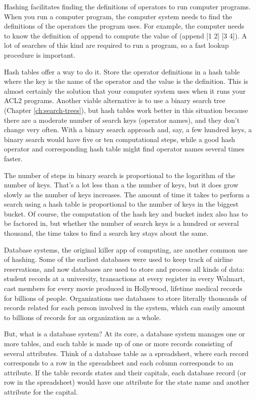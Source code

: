 Hashing facilitates finding the definitions of operators
to run computer programs.
When you run a computer program,
the computer system needs to find the definitions
of the operators the program uses.
For example, the computer needs to know the definition of
\textsf{append} to compute the value of \textsf{(append [1 2] [3  4])}.
A lot of searches of this kind are required to run a program,
so a fast lookup procedure is important.

Hash tables offer a way to do it. Store the operator
definitions in a hash table where the key is the name of the operator
and the value is the definition. This is almost certainly the solution
that your computer system uses when it runs your ACL2 programs.
Another viable alternative is to use a binary search tree
(Chapter \ref{ch:search-trees}), but hash tables work better
in this situation because there are a moderate number of search keys
(operator names), and they don't change very often.
With a binary search approach and, say, a few hundred keys,
a binary search would have five or ten computational steps,
while a good hash operator and corresponding hash table
might find operator names several times faster.

The number of steps in binary search is proportional to the
logarithm of the number of keys. That's a lot less than a the
number of keys, but it does grow slowly as the number of keys increases.
The amount of time it takes to perform a search using a hash table
is proportional to the number of keys in the biggest bucket.
Of course, the computation of the hash key and bucket index
also has to be factored in, but whether the number of search keys
is a hundred or several thousand, the time takes to find a search
key stays about the same.

Database systems, the original killer app of
computing, are another common use of hashing.
Some of the earliest databases were used to keep track
of airline reservations, and now databases are used to store and
process all kinds of data: student records at a university,
transactions at every register in every Walmart,
cast members for every movie produced in Hollywood,
lifetime medical records for billions of people.
Organizations use databases to store literally
thousands of records related for each person involved in the system,
which can easily amount to billions
of records for an organization as a whole.

But, what is a database system? At its core, a database system
manages one or more tables, and each table is made up of one or more
records consisting of several attributes.
Think of a database table as a
spreadsheet, where each record corresponds to a row in the spreadsheet
and each column corresponds to an attribute. If the table
records states and their capitals, each database
record (or row in the spreadsheet) would have one attribute for the
state name and another attribute for the capital.

